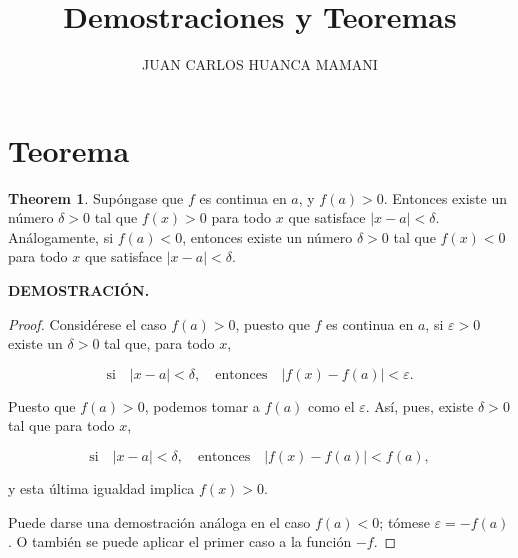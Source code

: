 \documentclass{article}
\title{Demostraciones y Teoremas}
\author{JUAN CARLOS HUANCA MAMANI}
\theoremstyle{definition}
\newtheorem{theorem}{Theorem}[section]
\begin{document}
\maketitle

\section{Teorema}

\begin{theorem}
    Supóngase que \( f \) es continua en \( a \), y \( f(a) > 0 \). Entonces existe un número \( \delta > 0 \) tal que \( f(x) > 0 \) para todo \( x \) que satisface \( |x - a| < \delta \). Análogamente, si \( f(a) < 0 \), entonces existe un número \( \delta > 0 \) tal que \( f(x) < 0 \) para todo \( x \) que satisface \( |x - a| < \delta \).
\end{theorem}

\noindent\textbf{DEMOSTRACIÓN.}

\begin{proof}
    Considérese el caso \( f(a) > 0 \), puesto que \( f \) es continua en \( a \), si \( \varepsilon > 0 \) existe un \( \delta > 0 \) tal que, para todo \( x \),
    
    \[\text{si} \quad |x - a| < \delta, \quad \text{entonces} \quad |f(x) - f(a)| < \varepsilon.\]
    
    Puesto que \( f(a) > 0 \), podemos tomar a \( f(a) \) como el \( \varepsilon \). Así, pues, existe \( \delta > 0 \) tal que para todo \( x \),
    
    \[ \text{si} \quad |x - a| < \delta, \quad \text{entonces} \quad |f(x) - f(a)| < f(a), \]
    
    y esta última igualdad implica \( f(x) > 0 \).
    
    Puede darse una demostración análoga en el caso \( f(a) < 0 \); tómese \( \varepsilon = -f(a) \). O también se puede aplicar el primer caso a la función \( -f \).
\end{proof}
\end{document}
